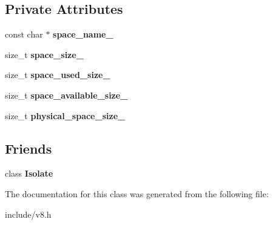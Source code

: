 \subsection*{Private Attributes}
\begin{DoxyCompactItemize}
\item 
const char $\ast$ {\bfseries space\+\_\+name\+\_\+}\hypertarget{classv8_1_1_heap_space_statistics_a042462c62d5789eda4cd8011f43b04e3}{}\label{classv8_1_1_heap_space_statistics_a042462c62d5789eda4cd8011f43b04e3}

\item 
size\+\_\+t {\bfseries space\+\_\+size\+\_\+}\hypertarget{classv8_1_1_heap_space_statistics_a982565762c12d6da18130e808ba7433a}{}\label{classv8_1_1_heap_space_statistics_a982565762c12d6da18130e808ba7433a}

\item 
size\+\_\+t {\bfseries space\+\_\+used\+\_\+size\+\_\+}\hypertarget{classv8_1_1_heap_space_statistics_ad0f8536bb48940cd95115439f02d48b1}{}\label{classv8_1_1_heap_space_statistics_ad0f8536bb48940cd95115439f02d48b1}

\item 
size\+\_\+t {\bfseries space\+\_\+available\+\_\+size\+\_\+}\hypertarget{classv8_1_1_heap_space_statistics_aff413d11dc7b0508cd246ef8e7c804e7}{}\label{classv8_1_1_heap_space_statistics_aff413d11dc7b0508cd246ef8e7c804e7}

\item 
size\+\_\+t {\bfseries physical\+\_\+space\+\_\+size\+\_\+}\hypertarget{classv8_1_1_heap_space_statistics_a961f81a0bdac0ffd6aa7d550d53d9e9b}{}\label{classv8_1_1_heap_space_statistics_a961f81a0bdac0ffd6aa7d550d53d9e9b}

\end{DoxyCompactItemize}
\subsection*{Friends}
\begin{DoxyCompactItemize}
\item 
class {\bfseries Isolate}\hypertarget{classv8_1_1_heap_space_statistics_aba4f0964bdacf2bbf62cf876e5d28d0a}{}\label{classv8_1_1_heap_space_statistics_aba4f0964bdacf2bbf62cf876e5d28d0a}

\end{DoxyCompactItemize}


The documentation for this class was generated from the following file\+:\begin{DoxyCompactItemize}
\item 
include/v8.\+h\end{DoxyCompactItemize}

